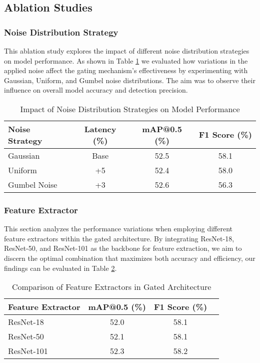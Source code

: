 \subsection{Ablation Studies}

\subsubsection{Noise Distribution Strategy}

This ablation study explores the impact of different noise distribution strategies on model performance. As shown in Table \ref{tab:noise_distribution} we evaluated how variations in the applied noise affect the gating mechanism's effectiveness by experimenting with Gaussian, Uniform, and Gumbel noise distributions. The aim was to observe their influence on overall model accuracy and detection precision.

\begin{table}[ht]
    \centering
    \caption{Impact of Noise Distribution Strategies on Model Performance}
    \label{tab:noise_distribution}
    \begin{tabular}{@{}lccc@{}}
    \toprule
    Noise Strategy & Latency (\%) & mAP@0.5 (\%) & F1 Score (\%) \\ 
    \midrule
    Gaussian & Base & 52.5 & 58.1 \\
    Uniform & +5 & 52.4 & 58.0 \\
    Gumbel Noise & +3 & 52.6 & 56.3 \\
    \bottomrule
    \end{tabular}
\end{table}
    

\subsubsection{Feature Extractor}

This section analyzes the performance variations when employing different feature extractors within the gated architecture. By integrating ResNet-18, ResNet-50, and ResNet-101 as the backbone for feature extraction, we aim to discern the optimal combination that maximizes both accuracy and efficiency, our findings can be evaluated in Table \ref{tab:feature_extractor}.

\begin{table}[ht]
    \centering
    \caption{Comparison of Feature Extractors in Gated Architecture}
    \label{tab:feature_extractor}
    \begin{tabular}{@{}lccc@{}}
    \toprule
    Feature Extractor & mAP@0.5 (\%) & F1 Score (\%) \\ 
    \midrule
    ResNet-18 & 52.0 & 58.1 \\
    ResNet-50 & 52.1 & 58.1 \\
    ResNet-101 & 52.3 & 58.2 \\
    \bottomrule
    \end{tabular}
\end{table}
    

